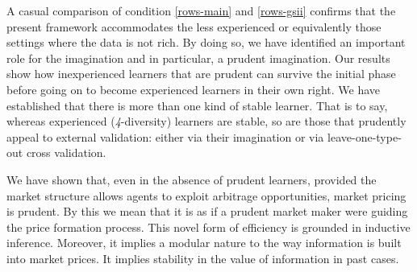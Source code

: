 \documentclass[ecta,nameyear,draft]{econsocart}
\newcommand{\fourdiv}{\textit{4}-\textup{diversity}}
\theoremstyle{plain}
\theoremstyle{remark}
\begin{document}
A casual comparison of condition \ref{rows-main} and \ref{rows-gsii} confirms
that the present framework accommodates the less experienced or equivalently
those settings where the data is not rich.  By doing so, we have identified an
important role for the imagination and in particular, a prudent imagination.
Our results show how inexperienced learners that are prudent can survive the
initial phase before going on to become experienced learners in their own
right. We have established that there is more than one kind of stable learner.
That is to say, whereas experienced (\fourdiv) learners are stable, so are
those that prudently appeal to external validation: either via their
imagination or via leave-one-type-out cross validation.

We have shown that, even in the absence of prudent learners, provided the
market structure allows agents to exploit arbitrage opportunities, market
pricing is prudent. By this we mean that it is as if a prudent market maker
were guiding the price formation process. This novel form of efficiency is
grounded in inductive inference. Moreover, it implies a modular nature to the
way information is built into market prices. It implies stability in the value
of information in past cases. 
\end{document}
